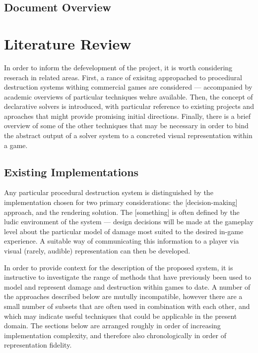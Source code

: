 \documentclass[11pt]{report}
\begin{document}
	\section{Document Overview}

\chapter{Literature Review}
	In order to inform the defevelopment of the project, it is worth considering reserach in related areas. First, a rance of exisitng appropached to procediural destruction systems withing commercial games are considered --- accompanied by academic overviews of particular techniques wehre available. Then, the concept of declarative solvers is introduced, with particular reference to existing projects and aproaches that might provide promising initial directions. Finally, there is a brief overview of some of the other techniques that may be necessary in order to bind the abstract output of a solver system to a concreted visual representation within a game.

	\section{Existing Implementations}
		Any particular procedural destruction system is distinguished by the implementation chosen for two primary considerations: the [decision-making] approach, and the rendering solution. The [something] is often defined by the ludic environment of the system --- design decisions will be made at the gameplay level about the particular model of damage most suited to the desired in-game experience. A suitable way of communicating this information to a player via visual (rarely, audible) representation can then be developed.

		In order to provide context for the description of the proposed system, it is instructive to investigate the range of methods that have previously been used to model and represent damage and destruction within games to date. A number of the approaches described below are mutully incompatible, however there are a small number of subsets that are often used in combination with each other, and which may indicate useful techniques that could be applicable in the present domain. The sections below are arranged roughly in order of increasing implementation complexity, and therefore also chronologically in order of representation fidelity.
\end{document}
